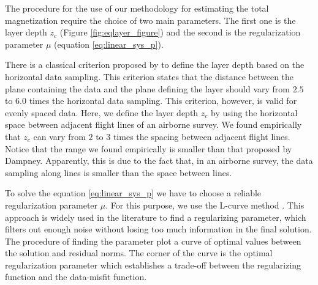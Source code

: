 The procedure for the use of our methodology for estimating the total magnetization 
require the choice of two main parameters. The first one is the layer depth $z_c$ 
(Figure \ref{fig:eqlayer_figure}) and the second is the regularization parameter 
$\mu$ (equation \ref{eq:linear_sys_p}).

There is a classical criterion proposed by \cite{dampney1969} to define the layer 
depth based on the horizontal data sampling. This criterion states that the 
distance between the plane containing the data and the  
plane defining the layer should vary from $2.5$ to $6.0$ times the horizontal 
data sampling. This criterion, however, is valid for evenly spaced data. 
Here, we define the layer depth $z_c$ by using the horizontal space between 
adjacent flight lines of an airborne survey. We found empirically that $z_c$ 
can vary from $2$ to $3$ times the spacing between adjacent flight lines.
Notice that the range we found empirically is smaller than that proposed by 
Dampney. Apparently, this is due to the fact that, in an airborne survey, 
the data sampling along lines is smaller than the space between lines.

To solve the equation \ref{eq:linear_sys_p} we have to choose a reliable 
regularization parameter $\mu$. For this purpose, we use the L-curve method 
\citep{hansen1992}. This approach is widely used in the literature to find a 
regularizing parameter, which filters out enough noise without losing too much 
information in the final solution. The procedure of finding the parameter plot a 
curve of optimal values between the solution and residual norms. The corner of 
the curve is the optimal regularization parameter which establishes a trade-off 
between the regularizing function and the data-misfit function. 
